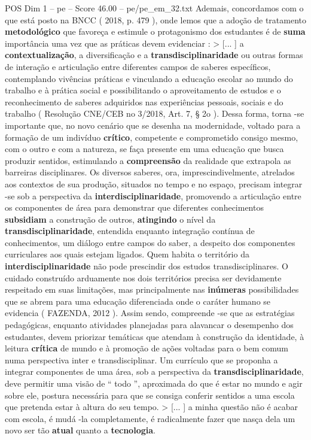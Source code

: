 \begin{textsample}{POS Dim 1 – pe – Score 46.00 – pe/pe\_em\_32.txt}
Ademais, concordamos com o que está posto na BNCC ( 2018, p. 479 ), onde lemos que a adoção de tratamento \textbf{metodológico} que favoreça e estimule o protagonismo dos estudantes é de \textbf{suma} importância uma vez que as práticas devem evidenciar : > [... ] a \textbf{contextualização}, a diversificação e a \textbf{transdisciplinaridade} ou outras formas de interação e articulação entre diferentes campos de saberes específicos, contemplando vivências práticas e vinculando a educação escolar ao mundo do trabalho e à prática social e possibilitando o aproveitamento de estudos e o reconhecimento de saberes adquiridos nas experiências pessoais, sociais e do trabalho ( Resolução CNE/CEB no 3/2018, Art. 7, § 2o ).
Dessa forma, torna -se importante que, no novo cenário que se desenha na modernidade, voltado para a formação de um indivíduo \textbf{crítico}, competente e comprometido consigo mesmo, com o outro e com a natureza, se faça presente em uma educação que busca produzir sentidos, estimulando a \textbf{compreensão} da realidade que extrapola as barreiras disciplinares.
Os diversos saberes, ora, imprescindivelmente, atrelados aos contextos de sua produção, situados no tempo e no espaço, precisam integrar -se sob a perspectiva da \textbf{interdisciplinaridade}, promovendo a articulação entre os componentes de área para demonstrar que diferentes conhecimentos \textbf{subsidiam} a construção de outros, \textbf{atingindo} o nível da \textbf{transdisciplinaridade}, entendida enquanto integração contínua de conhecimentos, um diálogo entre campos do saber, a despeito dos componentes curriculares aos quais estejam ligados.
Quem habita o território da \textbf{interdisciplinaridade} não pode prescindir dos estudos transdisciplinares.
O cuidado construído arduamente nos dois territórios precisa ser devidamente respeitado em suas limitações, mas principalmente nas \textbf{inúmeras} possibilidades que se abrem para uma educação diferenciada onde o caráter humano se evidencia ( FAZENDA, 2012 ).
Assim sendo, compreende -se que as estratégias pedagógicas, enquanto atividades planejadas para alavancar o desempenho dos estudantes, devem priorizar temáticas que atendam à construção da identidade, à leitura \textbf{crítica} de mundo e à promoção de ações voltadas para o bem comum numa perspectiva inter e transdisciplinar.
Um currículo que se proponha a integrar componentes de uma área, sob a perspectiva da \textbf{transdisciplinaridade}, deve permitir uma visão de “ todo ”, aproximada do que é estar no mundo e agir sobre ele, postura necessária para que se consiga conferir sentidos a uma escola que pretenda estar à altura do seu tempo. > [... ] a minha questão não é acabar com escola, é mudá -la completamente, é radicalmente fazer que nasça dela um novo ser tão \textbf{atual} quanto a \textbf{tecnologia}.

\end{textsample}
